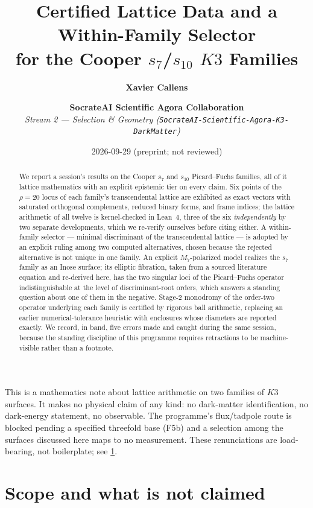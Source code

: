 \documentclass[11pt,a4paper]{article}
\title{\Large \textbf{Certified Lattice Data and a Within-Family Selector}\\[0.2em]
\textbf{for the Cooper $s_7$/$s_{10}$ $K3$ Families}}
\author{\textbf{Xavier Callens} \and \textbf{SocrateAI Scientific Agora Collaboration} \\[0.3em]
\textit{Stream 2 --- Selection \& Geometry (\texttt{SocrateAI-Scientific-Agora-K3-DarkMatter})}}
\date{2026-09-29 \quad (preprint; not reviewed)}
\theoremstyle{remark}
\begin{document}
\maketitle

\begin{scopebox}
This is a mathematics note about lattice arithmetic on two families of $K3$ surfaces. It makes no
physical claim of any kind: no dark-matter identification, no dark-energy statement, no observable.
The programme's flux/tadpole route is blocked pending a specified threefold base (F5b) and a
selection among the surfaces discussed here maps to no measurement. These renunciations are load-bearing,
not boilerplate; see \cref{sec:scope}.
\end{scopebox}

\begin{abstract}
We report a session's results on the Cooper $s_7$ and $s_{10}$ Picard--Fuchs families, all of it lattice
mathematics with an explicit epistemic tier on every claim. Six points of the $\rho=20$ locus of each
family's transcendental lattice are exhibited as exact vectors with saturated orthogonal complements,
reduced binary forms, and frame indices; the lattice arithmetic of all twelve is kernel-checked in Lean~4,
three of the six \emph{independently} by two separate developments, which we re-verify ourselves before
citing either. A within-family selector --- minimal discriminant of the transcendental lattice --- is
adopted by an explicit ruling among two computed alternatives, chosen because the rejected alternative is
not unique in one family. An explicit $M_7$-polarized model realizes the $s_7$ family as an Inose surface;
its elliptic fibration, taken from a sourced literature equation and re-derived here, has the two
singular loci of the Picard--Fuchs operator indistinguishable at the level of discriminant-root orders,
which answers a standing question about one of them in the negative. Stage-2 monodromy of the order-two
operator underlying each family is certified by rigorous ball arithmetic, replacing an earlier numerical-tolerance
heuristic with enclosures whose diameters are reported exactly. We record, in band, five errors made and
caught during the same session, because the standing discipline of this programme requires retractions to
be machine-visible rather than a footnote.
\end{abstract}

\tableofcontents

\section{Scope and what is not claimed}\label{sec:scope}
\end{document}
